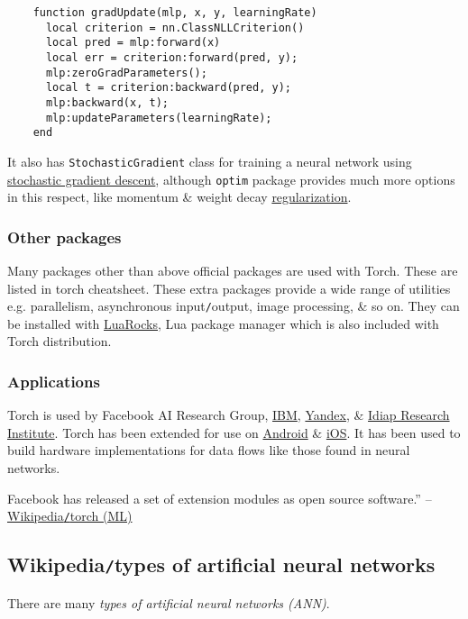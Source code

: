 \documentclass{article}
\begin{document}
\begin{verbatim}
	function gradUpdate(mlp, x, y, learningRate)
	  local criterion = nn.ClassNLLCriterion()
	  local pred = mlp:forward(x)
	  local err = criterion:forward(pred, y); 
	  mlp:zeroGradParameters();
	  local t = criterion:backward(pred, y);
	  mlp:backward(x, t);
	  mlp:updateParameters(learningRate);
	end
\end{verbatim}
It also has {\tt StochasticGradient} class for training a neural network using \href{https://en.wikipedia.org/wiki/Stochastic_gradient_descent}{stochastic gradient descent}, although {\tt optim} package provides much more options in this respect, like momentum \& weight decay \href{https://en.wikipedia.org/wiki/Regularization_(mathematics)}{regularization}.

\subsubsection{Other packages}
Many packages other than above official packages are used with Torch. These are listed in torch cheatsheet. These extra packages provide a wide range of utilities e.g. parallelism, asynchronous input{\tt/}output, image processing, \& so on. They can be installed with \href{https://en.wikipedia.org/wiki/LuaRocks}{LuaRocks}, Lua package manager which is also included with Torch distribution.

\subsubsection{Applications}
Torch is used by Facebook AI Research Group, \href{https://en.wikipedia.org/wiki/IBM}{IBM}, \href{https://en.wikipedia.org/wiki/Yandex}{Yandex}, \& \href{https://en.wikipedia.org/wiki/Idiap_Research_Institute}{Idiap Research Institute}. Torch has been extended for use on \href{https://en.wikipedia.org/wiki/Android_(operating_system)}{Android} \& \href{https://en.wikipedia.org/wiki/IOS}{iOS}. It has been used to build hardware implementations for data flows like those found in neural networks.

Facebook has released a set of extension modules as open source software.'' -- \href{https://en.wikipedia.org/wiki/Torch_(machine_learning)}{Wikipedia{\tt/}torch (ML)}


\subsection{Wikipedia{\tt/}types of artificial neural networks}
There are many {\it types of artificial neural networks (ANN)}.
\end{document}
